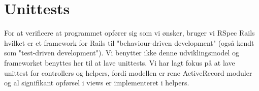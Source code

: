 \section{Unittests}
\label{sec:unittests}
For at verificere at programmet opfører sig som vi ønsker, bruger vi RSpec Rails hvilket er et framework for Rails til "behaviour-driven development" (også kendt som "test-driven development"). Vi benytter ikke denne udviklingsmodel og frameworket benyttes her til at lave unittests.
Vi har lagt fokus på at lave unittest for controllers og helpers, fordi modellen er rene ActiveRecord moduler og al signifikant opførsel i views er implementeret i helpers.
